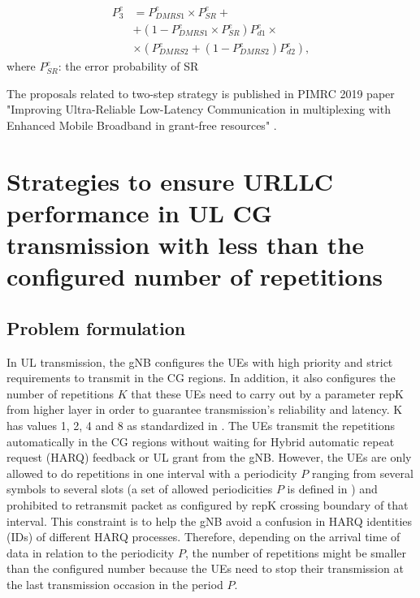 \documentclass{report}
\begin{document}
\begin{equation}
\begin{split}
 P^{e}_{3} &= P^{e}_{DMRS1}\times P^{e}_{SR} + \\
        &+ (1-P^{e}_{DMRS1}\times P^{e}_{SR})P^{e}_{d1}\times\\
        &\times(P^{e}_{DMRS2} + (1-P^{e}_{DMRS2})P^{e}_{d2}),\label{eq3}   
\end{split}
\end{equation}
where $P^{e}_{SR}$: the error probability of SR

The proposals related to two-step strategy is published in PIMRC 2019 paper "Improving Ultra-Reliable Low-Latency Communication in multiplexing with Enhanced Mobile Broadband in grant-free resources" \cite{ad99}. 

\chapter{Strategies to ensure URLLC performance in UL CG transmission with less than the configured number of repetitions} \label{S3}

\section{Problem formulation}

In UL transmission, the gNB configures the UEs with high priority and strict requirements to transmit in the CG regions. In addition, it also configures the number of repetitions $K$ that these UEs need to carry out by a parameter repK from higher layer in order to guarantee transmission’s reliability and latency. K has values 1, 2, 4 and 8 as standardized in \cite{ad16}. The UEs transmit the repetitions automatically in the CG regions without waiting for Hybrid automatic repeat request (HARQ) feedback or UL grant from the gNB. However, the UEs are only allowed to do repetitions in one interval with a periodicity $P$ ranging from several symbols to several slots (a set of allowed periodicities $P$ is defined in \cite{ad16}) and prohibited to retransmit packet as configured by repK crossing boundary of that interval. This constraint is to help the gNB avoid a confusion in HARQ identities (IDs) of different HARQ processes. Therefore, depending on the arrival time of data in relation to the periodicity $P$, the number of repetitions might be smaller than the configured number because the UEs need to stop their transmission at the last transmission occasion in the period $P$.
\end{document}
